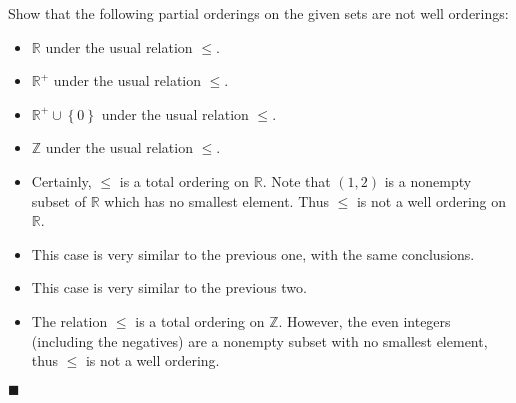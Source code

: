 \documentclass[12pt]{article}
\renewcommand{\qed}{\hfill$\blacksquare$}
\renewenvironment{proof}{\begin{addmargin}[1em]{0em}\begin{newproof}}{\end{newproof}\end{addmargin}\qed}
\newenvironment{problem}[2][Exercise]{\begin{trivlist}
\item[\hskip \labelsep {\bfseries #1}\hskip \labelsep {\bfseries #2.}]}{\end{trivlist}}
\begin{document}
\begin{problem}{I.2.3}
Show that the following partial orderings on the given sets are not well orderings:
\begin{itemize}
	\item $\mathbb{R}$ under the usual relation $\leq$.
	\item $\mathbb{R}^+$ under the usual relation $\leq$.
	\item $\mathbb{R}^+\cup \left\{0\right\}$ under the usual relation $\leq$.
	\item $\mathbb{Z}$ under the usual relation $\leq$.
\end{itemize}
\end{problem}
\begin{proof}
\begin{itemize}
	\item Certainly, $\leq$ is a total ordering on $\mathbb{R}$. Note that $\left(1,2\right)$ is a nonempty subset of $\mathbb{R}$ which has no smallest element. Thus $\leq$ is not a well ordering on $\mathbb{R}$.
	\item This case is very similar to the previous one, with the same conclusions.
	\item This case is very similar to the previous two.
	\item The relation $\leq$ is a total ordering on $\mathbb{Z}$. However, the even integers (including the negatives) are a nonempty subset with no smallest element, thus $\leq$ is not a well ordering.
\end{itemize}
\end{proof}
\end{document}
